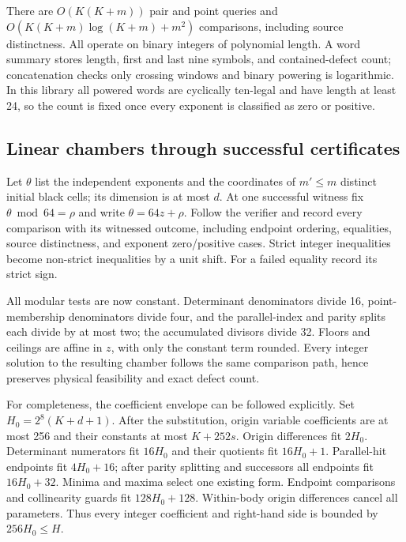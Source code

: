 There are $O(K(K+m))$ pair and point queries and
$O(K(K+m)\log(K+m)+m^2)$ comparisons, including source distinctness.
All operate on binary integers of polynomial length. A word summary stores
length, first and last nine symbols, and contained-defect count; concatenation
checks only crossing windows and binary powering is logarithmic. In this
library all powered words are cyclically ten-legal and have length at least
24, so the count is fixed once every exponent is classified as zero or positive.

\subsection{Linear chambers through successful certificates}
Let $\theta$ list the independent exponents and the coordinates of $m'\le m$
distinct initial black cells; its dimension is at most $d$. At one successful
witness fix $\theta\bmod64=\rho$ and write $\theta=64z+\rho$. Follow the verifier
and record every comparison with its witnessed outcome, including endpoint
ordering, equalities, source distinctness, and exponent zero/positive cases.
Strict integer inequalities become non-strict inequalities by a unit shift.
For a failed equality record its strict sign.

All modular tests are now constant. Determinant denominators divide 16,
point-membership denominators divide four, and the parallel-index and parity
splits each divide by at most two; the accumulated divisors divide 32.
Floors and ceilings are affine in $z$, with only the constant term rounded.
Every integer solution to the resulting chamber follows the same comparison
path, hence preserves physical feasibility and exact defect count.

For completeness, the coefficient envelope can be followed explicitly. Set
$H_0=2^8(K+d+1)$. After the substitution, origin variable coefficients are at
most 256 and their constants at most $K+252s$. Origin differences fit
$2H_0$. Determinant numerators fit $16H_0$ and their quotients fit
$16H_0+1$. Parallel-hit endpoints fit $4H_0+16$; after parity splitting and
successors all endpoints fit $16H_0+32$. Minima and maxima select one existing
form. Endpoint comparisons and collinearity guards fit $128H_0+128$.
Within-body origin differences cancel all parameters. Thus every integer
coefficient and right-hand side is bounded by $256H_0\le H$.

